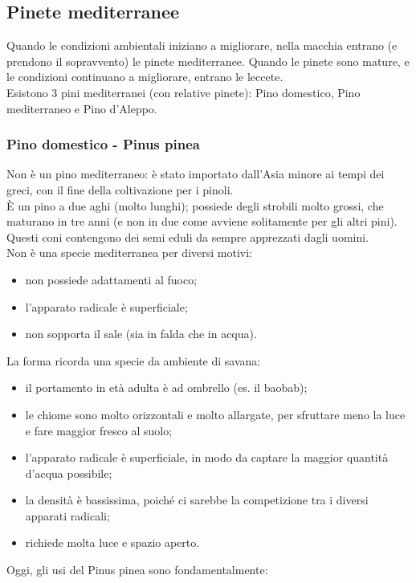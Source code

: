 \subsection{Pinete mediterranee}
Quando le condizioni ambientali iniziano a migliorare, nella macchia entrano (e prendono il sopravvento) le pinete mediterranee. Quando le pinete sono mature, e le condizioni continuano a migliorare, entrano le leccete.\\
Esistono 3 pini mediterranei (con relative pinete): Pino domestico, Pino mediterraneo e Pino d'Aleppo.
\subsubsection{Pino domestico - Pinus pinea}
Non è un pino mediterraneo: è stato importato dall'Asia minore ai tempi dei greci, con il fine della coltivazione per i pinoli.\\
È un pino a due aghi (molto lunghi); possiede degli strobili molto grossi, che maturano in tre anni (e non in due come avviene solitamente per gli altri pini). Questi coni contengono dei semi eduli da sempre apprezzati dagli uomini.\\
Non è una specie mediterranea per diversi motivi:
\begin{itemize}[nosep]
    \item non possiede adattamenti al fuoco; 
    \item l'apparato radicale è superficiale; 
    \item non sopporta il sale (sia in falda che in acqua).
\end{itemize}
La forma ricorda una specie da ambiente di savana:
\begin{itemize}[nosep]
    \item il portamento in età adulta è ad ombrello (es. il baobab);
    \item le chiome sono molto orizzontali e molto allargate, per sfruttare meno la luce e fare maggior fresco al suolo;
    \item l'apparato radicale è superficiale, in modo da captare la maggior quantità d'acqua possibile;
    \item la densità è bassissima, poiché ci sarebbe la competizione tra i diversi apparati radicali;
    \item richiede molta luce e spazio aperto.
\end{itemize} 
Oggi, gli usi del Pinus pinea sono fondamentalmente:
